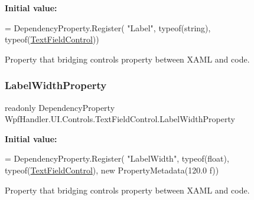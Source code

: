 {\bfseries Initial value\+:}
\begin{DoxyCode}
= DependencyProperty.Register(
          \textcolor{stringliteral}{"Label"}, typeof(\textcolor{keywordtype}{string}), typeof(\mbox{\hyperlink{class_wpf_handler_1_1_u_i_1_1_controls_1_1_text_field_control_a90ff02e9ee1b2b63d034a3376594ddf4}{TextFieldControl}}))
\end{DoxyCode}


Property that bridging control\textquotesingle{}s property between X\+A\+ML and code. 

\mbox{\label{class_wpf_handler_1_1_u_i_1_1_controls_1_1_text_field_control_a8dbe89b4efe3eb38c82799e8ce68cf2c}} 
\subsubsection{\texorpdfstring{Label\+Width\+Property}{LabelWidthProperty}}
{\footnotesize\ttfamily readonly Dependency\+Property Wpf\+Handler.\+U\+I.\+Controls.\+Text\+Field\+Control.\+Label\+Width\+Property\hspace{0.3cm}{\ttfamily [static]}}

{\bfseries Initial value\+:}
\begin{DoxyCode}
= DependencyProperty.Register(
          \textcolor{stringliteral}{"LabelWidth"}, typeof(\textcolor{keywordtype}{float}), typeof(\mbox{\hyperlink{class_wpf_handler_1_1_u_i_1_1_controls_1_1_text_field_control_a90ff02e9ee1b2b63d034a3376594ddf4}{TextFieldControl}}), \textcolor{keyword}{new} PropertyMetadata(120.0
      f))
\end{DoxyCode}


Property that bridging control\textquotesingle{}s property between X\+A\+ML and code. 

\mbox{\label{class_wpf_handler_1_1_u_i_1_1_controls_1_1_text_field_control_ab49579689a93b206513268c77d6343c7}} 

